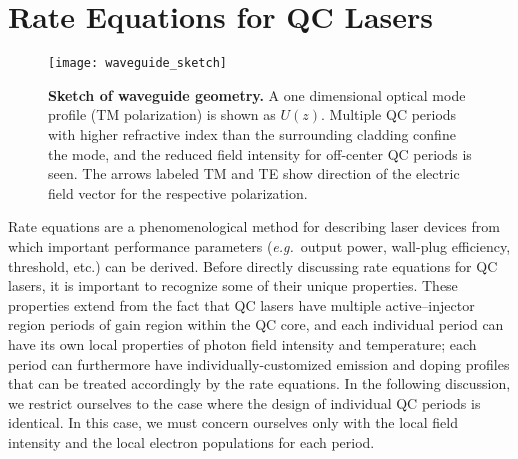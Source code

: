 \documentclass[12pt]{report}
\begin{document}
{%

\section{Rate Equations for QC Lasers}

\begin{figure}[tp]
\centering
\texttt{[image: waveguide\_sketch]}
\caption[Sketch of waveguide geometry]{{\textbf{Sketch of waveguide geometry.}} A one dimensional optical mode profile (TM polarization) is shown as $U(z)$.  Multiple QC periods with higher refractive index than the surrounding cladding confine the mode, and the reduced field intensity for off-center QC periods is seen.  The arrows labeled TM and TE show direction of the electric field vector for the respective polarization.}
\label{chpt1:wg_sketch}
\end{figure}

Rate equations are a phenomenological method for describing laser devices from which important performance parameters (\emph{e.g.}\ output power, wall-plug efficiency, threshold, etc.) can be derived.  Before directly discussing rate equations for QC lasers, it is important to recognize some of their unique properties.  These properties extend from the fact that QC lasers have multiple active--injector region periods of gain region within the QC core, and each individual period can have its own local properties of photon field intensity and temperature; each period can furthermore have individually-customized emission \cite{Gmachl:2002:Nature:broadband} and doping profiles \cite{Hoffman:OptExp:2007} that can be treated accordingly by the rate equations. In the following discussion, we restrict ourselves to the case where the design of individual QC periods is identical.  In this case, we must concern ourselves only with the local field intensity and the local electron populations for each period.

}
\end{document}
